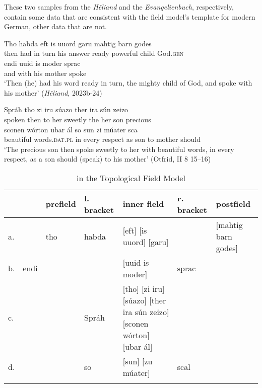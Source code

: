 \noindent These two samples from the \textit{Hêliand} and the \textit{Evangelienbuch}, respectively, contain some data that are consistent with the field model’s template for modern German, other data that are not.\largerpage

\ea%
    \label{ex:7:7}
\ea
\gll Tho    habda   eft    is   uuord  garu  mahtig    barn  godes\\
    then  had    {in turn}   his   answer  ready   powerful  child   God.\textsc{gen}\\

\gll    endi    uuid  is  moder   sprac\\
and      with   his   mother   spoke\\

\glt ‘Then (he) had his word ready in turn, the mighty child of God, and spoke with his mother’ (\textit{Hêliand}, 2023b-24)

\ex
\gll Spráh  tho     zi   iru   súazo      ther   ira   sún   zeizo\\
  spoken   then  to  her   sweetly  the      her  son   precious\\

\gll sconen     wórton        {ubar ál}        so   sun   zi   múater   sca\\
beautiful  words.\textsc{dat.pl}  {in every respect}  as   son  to  mother   should\\
\glt ‘The precious son then spoke sweetly to her with beautiful words, in every respect, as a son should (speak) to his mother’ (Otfrid, II 8 15--16)
    \z
\z

\begin{table}
\caption{ in the Topological Field Model }
\label{tab:7.1}
\small
\begin{tabularx}{\textwidth}{lllQQQQ}
\lsptoprule
 &  & prefield & l. bracket & inner field & r. bracket & postfield\\
 \midrule
a. &  & tho & habda & [eft] [is uuord] [garu] &  & [mahtig barn godes]\\
\tablevspace
b. & endi &  &  & [uuid is moder] & sprac & \\
\tablevspace
c. &  &  & Spráh & [tho] [zi iru] [súazo] [ther ira sún zeizo] [sconen wórton] [ubar ál] &  & \\
\tablevspace
d. &  &  & so & [sun] [zu múater] & scal & \\
\lspbottomrule
\end{tabularx}
\end{table}

